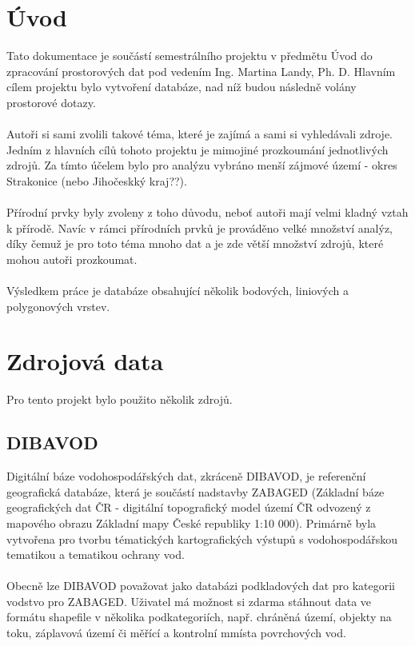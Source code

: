 \documentclass[a4paper, 12pt]{article}
\begin{document}
\section{Úvod}
Tato dokumentace je součástí semestrálního projektu v předmětu Úvod do zpracování prostorových dat pod vedením Ing. Martina Landy, Ph. D. Hlavním cílem projektu bylo vytvoření databáze, nad níž budou následně volány prostorové dotazy.\\
\\
Autoři si sami zvolili takové téma, které je zajímá a sami si vyhledávali zdroje. Jedním z hlavních cílů tohoto projektu je mimojiné prozkoumání jednotlivých zdrojů. Za tímto účelem bylo pro analýzu vybráno menší zájmové území - okres Strakonice (nebo Jihočeskký kraj??). \\
\\
Přírodní prvky byly zvoleny z toho důvodu, neboť autoři mají velmi kladný vztah k přírodě. Navíc v rámci přírodních prvků je prováděno velké množství analýz, díky čemuž je pro toto téma mnoho dat a je zde větší množství zdrojů, které mohou autoři prozkoumat.\\
\\
Výsledkem práce je databáze obsahující několik bodových, liniových a polygonových vrstev.

\clearpage
\section{Zdrojová data}
Pro tento projekt bylo použito několik zdrojů. 

\subsection{DIBAVOD}
Digitální báze vodohospodářských dat, zkráceně DIBAVOD, je referenční geografická databáze, která je součástí nadstavby ZABAGED (Základní báze geografických dat ČR - digitální topografický model území ČR odvozený z mapového obrazu Základní mapy České republiky 1:10 000). Primárně byla vytvořena pro tvorbu tématických kartografických výstupů s vodohospodářskou tematikou a tematikou ochrany vod. \\
\\
Obecně lze DIBAVOD považovat jako databázi podkladových dat pro kategorii vodstvo pro ZABAGED. Uživatel má možnost si zdarma stáhnout data ve formátu shapefile v několika podkategoriích, např. chráněná území, objekty na toku, záplavová území či měřící a kontrolní mmísta povrchových vod. 
\end{document}
